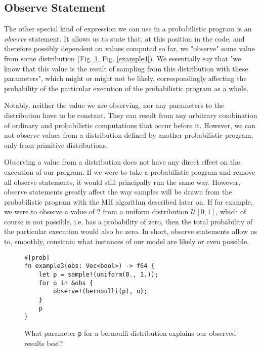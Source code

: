 \subsection{Observe Statement}

The other special kind of expression we can use in a probabilistic program is an \textit{observe} statement. It allows us to state that, at this position in the code, and therefore possibly dependent on values computed so far, we "observe" some value from some distribution (Fig. \ref{example3}, Fig. \ref{example4}). We essentially say that "we know that this value is the result of sampling from this distribution with these parameters", which might or might not be likely, correspondingly affecting the probability of the particular execution of the probabilistic program as a whole. 

Notably, neither the value we are observing, nor any parameters to the distribution have to be constant. They can result from any arbitrary combination of ordinary and probabilistic computations that occur before it. However, we can not observe values from a distribution defined by another probabilistic program, only from primitive distributions.

Observing a value from a distribution does not have any direct effect on the execution of our program. If we were to take a probabilistic program and remove all observe statements, it would still principally run the same way. However, observe statements greatly affect the way samples will be drawn from the probabilistic program with the MH algorithm described later on. If for example, we were to observe a value of $2$ from a uniform distribution $\mathcal{U}[0,1]$, which of course is not possible, i.e. has a probability of zero, then the total probability of the particular execution would also be zero. In short, observe statements allow us to, smoothly, constrain what instances of our model are likely or even possible.

\begin{figure}[h]
\begin{lstlisting}
#[prob]
fn example3(obs: Vec<bool>) -> f64 {
    let p = sample!(uniform(0., 1.));
    for o in &obs {
        observe!(bernoulli(p), o);
    }
    p
}
\end{lstlisting}
\caption{What parameter \lstinline{p} for a bernoulli distribution explains our observed results best?}
\label{example3}
\end{figure}

